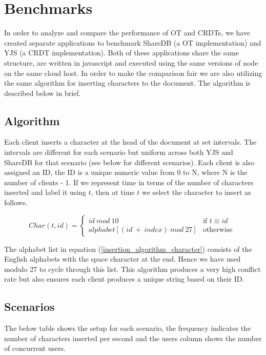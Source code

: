 \documentclass[12pt]{article}
\begin{document}
  \section*{Benchmarks}
  In order to analyze and compare the performance of OT and CRDTs, we have created separate applications to benchmark ShareDB (a OT implementation) and YJS (a CRDT implementation).
  Both of these applications share the same structure, are written in javascript and executed using the same versions of node on the same cloud host.
  In order to make the comparison fair we are also utilizing the same algorithm for inserting characters to the document. The algorithm is described below in brief.

  \subsection{Algorithm}
  Each client inserts a character at the head of the document at set intervals. The intervals are different for each scenario but uniform across both YJS and ShareDB for that scenario (see below for different scenarios).
  Each client is also assigned an ID, the ID is a unique numeric value from 0 to N, where N is the number of clients - 1.
  If we represent time in terms of the number of characters inserted and label it using \(t\), then at time \(t\) we select the character to insert as follows.
  
  \begin{equation} \label{insertion_algorithm_character}
    Char(t, id) =
    \left\{
	    \begin{array}{ll}
		    id\ mod\ 10 & \mbox{if } t \equiv id \\
        alphabet[(id\ +\ index)\ mod\ 27] & \mbox{otherwise }
	    \end{array}
    \right.
  \end{equation}

  The alphabet list in equation (\ref{insertion_algorithm_character}) consists of the English alphabets with the space character at the end.
  Hence we have used modulo 27 to cycle through this list. This algorithm produces a very high conflict rate but also ensures each client 
  produces a unique string based on their ID.

  \subsection{Scenarios}
  The below table shows the setup for each scenario, the frequency indicates the number of characters 
  inserted per second and the users column shows the number of concurrent users.\\
\end{document}
